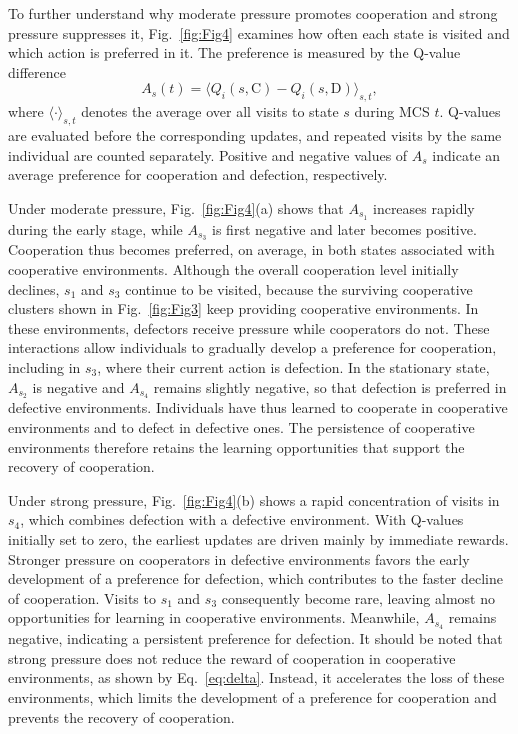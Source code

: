 \documentclass[%
  aip,cha,
  amsmath,amssymb,
  reprint,
  floatfix,
  article-title,
]{revtex4-2}
\begin{document}
To further understand why moderate pressure promotes cooperation and strong pressure suppresses it, Fig.~\ref{fig:Fig4} examines how often each state is visited and which action is preferred in it. The preference is measured by the Q-value difference
\begin{equation}
A_s(t)=\bigl\langle Q_i(s,\mathrm{C})-Q_i(s,\mathrm{D})\bigr\rangle_{s,t},
\label{eq:gap}
\end{equation}
where $\langle\cdot\rangle_{s,t}$ denotes the average over all visits to state $s$ during MCS $t$. Q-values are evaluated before the corresponding updates, and repeated visits by the same individual are counted separately. Positive and negative values of $A_s$ indicate an average preference for cooperation and defection, respectively.

Under moderate pressure, Fig.~\ref{fig:Fig4}(a) shows that $A_{s_1}$ increases rapidly during the early stage, while $A_{s_3}$ is first negative and later becomes positive. Cooperation thus becomes preferred, on average, in both states associated with cooperative environments. Although the overall cooperation level initially declines, $s_1$ and $s_3$ continue to be visited, because the surviving cooperative clusters shown in Fig.~\ref{fig:Fig3} keep providing cooperative environments. In these environments, defectors receive pressure while cooperators do not. These interactions allow individuals to gradually develop a preference for cooperation, including in $s_3$, where their current action is defection. In the stationary state, $A_{s_2}$ is negative and $A_{s_4}$ remains slightly negative, so that defection is preferred in defective environments. Individuals have thus learned to cooperate in cooperative environments and to defect in defective ones. The persistence of cooperative environments therefore retains the learning opportunities that support the recovery of cooperation.

Under strong pressure, Fig.~\ref{fig:Fig4}(b) shows a rapid concentration of visits in $s_4$, which combines defection with a defective environment. With Q-values initially set to zero, the earliest updates are driven mainly by immediate rewards. Stronger pressure on cooperators in defective environments favors the early development of a preference for defection, which contributes to the faster decline of cooperation. Visits to $s_1$ and $s_3$ consequently become rare, leaving almost no opportunities for learning in cooperative environments. Meanwhile, $A_{s_4}$ remains negative, indicating a persistent preference for defection. It should be noted that strong pressure does not reduce the reward of cooperation in cooperative environments, as shown by Eq.~\eqref{eq:delta}. Instead, it accelerates the loss of these environments, which limits the development of a preference for cooperation and prevents the recovery of cooperation.
\end{document}
